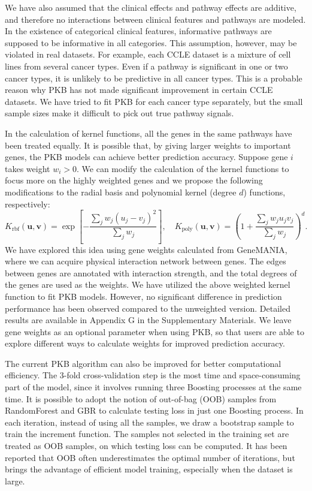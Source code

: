 \documentclass[a4paper,12pt]{article}
\newcommand{\bd}[1]{\mathbf{#1}}
\begin{document}
We have also assumed that the clinical effects and pathway effects are additive, and therefore no interactions between clinical features and pathways are modeled. In the existence of categorical clinical features, informative pathways are supposed to be informative in all categories. This assumption, however, may be violated in real datasets. For example, each CCLE dataset is a mixture of cell lines from several cancer types. Even if a pathway is significant in one or two cancer types, it is unlikely to be predictive in all cancer types. This is a probable reason why PKB has not made significant improvement in certain CCLE datasets. We have tried to fit PKB for each cancer type separately, but the small sample sizes make it difficult to pick out true pathway signals. 

In the calculation of kernel functions, all the genes in the same pathways have been treated equally. It is possible that, by giving larger weights to important genes, the PKB models can achieve better prediction accuracy. Suppose gene $i$ takes weight $w_i > 0$. We can modify the calculation of the kernel functions to focus more on the highly weighted genes and we propose the following modifications to the radial basis and polynomial kernel (degree $d$) functions, respectively:
$$ K_{\text{rbf}}(\bd{u}, \bd{v})  =  \exp \left[ - \frac{\sum_j w_j (u_j - v_j)^2}{\sum_j w_j}  \right], \quad
K_{\text{poly}}(\bd{u}, \bd{v})  =  \left( 1 + \frac{ \sum_j w_j u_j v_j }{ \sum_j w_j } \right)^d.$$
We have explored this idea using gene weights calculated from GeneMANIA, \citep{warde2010genemania} where we can acquire physical interaction network between genes. The edges between genes are annotated with interaction strength, and the total degrees of the genes are used as the weights. We have utilized the above weighted kernel function to fit PKB models. However, no significant difference in prediction performance has been observed compared to the unweighted version. Detailed results are available in Appendix G in the Supplementary Materials. We leave gene weights as an optional parameter when using PKB, so that users are able to explore different ways to calculate weights for improved prediction accuracy.

The current PKB algorithm can also be improved for better computational efficiency. The 3-fold cross-validation step is the most time and space-consuming part of the model, since it involves running three Boosting processes at the same time. It is possible to adopt the notion of out-of-bag (OOB) samples from RandomForest and GBR to calculate testing loss in just one Boosting process. In each iteration, instead of using all the samples, we draw a bootstrap sample to train the increment function. The samples not selected in the training set are treated as OOB samples, on which testing loss can be computed. It has been reported that OOB often underestimates the optimal number of iterations, \citep{ridgeway2006gbm} but brings the advantage of efficient model training, especially when the dataset is large.
\end{document}
